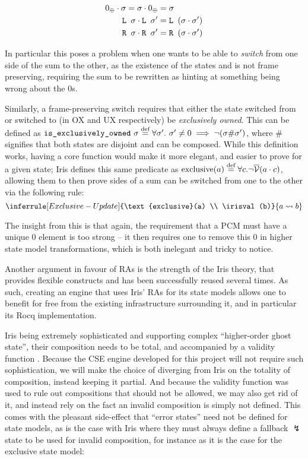 {
\newcommand{\LS}[0]{\code{L }}
\newcommand{\RS}[0]{\code{R }}
\begin{align*}
	0_\oplus \cdot \st = \st \cdot 0_\oplus &= \st \\*
	\LS\st \cdot \LS\st' &= \LS (\st\cdot\st') \\*
	\RS\st \cdot \RS\st' &= \RS (\st\cdot\st')
\end{align*}
}


In particular this poses a problem when one wants to be able to \emph{switch} from one side of the sum to the other, as the existence of the states  and  is not frame preserving, requiring the sum to be rewritten as  hinting at something being wrong about the $0$s.

Similarly, a frame-preserving switch requires that either the state switched from or switched to (in OX and UX respectively) be \emph{exclusively owned}. This can be defined as $\texttt{is\_exclusively\_owned} ~\sigma \stackrel{\textnormal{def}}= \forall \sigma'.~\sigma'\neq 0\implies \neg(\sigma\#\sigma')$, where $\#$ signifies that both states are disjoint and can be composed. While this definition works, having a core function would make it more elegant, and easier to prove for a given state; Iris defines this same predicate as $\text{exclusive}(a)\stackrel{\textnormal{def}}=\forall c.\neg\overline{\cal V}(a\cdot c)$, allowing them to then prove sides of a sum can be switched from one to the other via the following rule:
\[
\inferrule[Exclusive-Update]
	{\text{exclusive}(a) \\ \irisval(b)}
	{a \rightsquigarrow b}
\]

The insight from this is that again, the requirement that a PCM must have a unique $0$ element is too strong -- it then requires one to remove this $0$ in higher state model transformations, which is both inelegant and tricky to notice.

Another argument in favour of RAs is the strength of the Iris theory, that provides flexible constructs and has been successfully reused several times. As such, creating an engine that uses Iris' RAs for its state models allows one to benefit for free from the existing infrastructure surrounding it, and in particular its Rocq implementation.

Iris being extremely sophisticated and supporting complex ``higher-order ghost state'', their composition needs to be total, and accompanied by a validity function \irisval. Because the CSE engine developed for this project will not require such sophistication, we will make the choice of diverging from Iris on the totality of composition, instead keeping it partial. And because the validity function was used to rule out compositions that should not be allowed, we may also get rid of it, and instead rely on the fact an invalid composition is simply not defined. This comes with the pleasant side-effect that ``error states'' need not be defined for state models, as is the case with Iris where they must always define a fallback $\lightning$ state to be used for invalid composition, for instance as it is the case for the exclusive state model:

